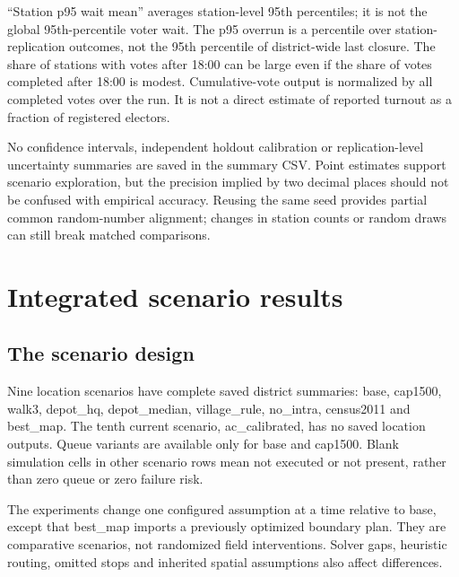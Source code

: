 \documentclass[11pt,a4paper,oneside]{report}
\newcommand{\source}[1]{\par\nopagebreak[4]{\footnotesize\color{teal}Evidence: #1.}\par}
\begin{document}
``Station p95 wait mean'' averages station-level 95th percentiles; it is not the global 95th-percentile voter wait. The p95 overrun is a percentile over station-replication outcomes, not the 95th percentile of district-wide last closure. The share of stations with votes after 18:00 can be large even if the share of votes completed after 18:00 is modest. Cumulative-vote output is normalized by all completed votes over the run. It is not a direct estimate of reported turnout as a fraction of registered electors.

No confidence intervals, independent holdout calibration or replication-level uncertainty summaries are saved in the summary CSV. Point estimates support scenario exploration, but the precision implied by two decimal places should not be confused with empirical accuracy. Reusing the same seed provides partial common random-number alignment; changes in station counts or random draws can still break matched comparisons.
\source{[S11]}

\chapter{Integrated scenario results}
\section{The scenario design}
Nine location scenarios have complete saved district summaries: base, cap1500, walk3, depot\_hq, depot\_median, village\_rule, no\_intra, census2011 and best\_map. The tenth current scenario, ac\_calibrated, has no saved location outputs. Queue variants are available only for base and cap1500. Blank simulation cells in other scenario rows mean not executed or not present, rather than zero queue or zero failure risk.

The experiments change one configured assumption at a time relative to base, except that best\_map imports a previously optimized boundary plan. They are comparative scenarios, not randomized field interventions. Solver gaps, heuristic routing, omitted stops and inherited spatial assumptions also affect differences.
\source{[S9]}
\end{document}
